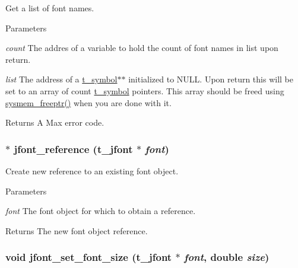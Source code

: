Get a list of font names. 
\begin{DoxyParams}{Parameters}
\item[{\em count}]The addres of a variable to hold the count of font names in list upon return. \item[{\em list}]The address of a \hyperlink{structt__symbol}{t\_\-symbol}$\ast$$\ast$ initialized to NULL. Upon return this will be set to an array of count \hyperlink{structt__symbol}{t\_\-symbol} pointers. This array should be freed using \hyperlink{group__memory_ga200c82639e547869db1f3887d17102d3}{sysmem\_\-freeptr()} when you are done with it. \end{DoxyParams}
\begin{DoxyReturn}{Returns}
A Max error code. 
\end{DoxyReturn}
\hypertarget{group__jfont_gaa3cdecfe931e80252a71bb6b2a9ee1f8}{
\subsubsection[{jfont\_\-reference}]{$\ast$ jfont\_\-reference ({\bf t\_\-jfont} $\ast$ {\em font})}}
\label{group__jfont_gaa3cdecfe931e80252a71bb6b2a9ee1f8}


Create new reference to an existing font object. 
\begin{DoxyParams}{Parameters}
\item[{\em font}]The font object for which to obtain a reference. \end{DoxyParams}
\begin{DoxyReturn}{Returns}
The new font object reference. 
\end{DoxyReturn}
\hypertarget{group__jfont_ga5857efa47dcf9dbc1822f7500c4aa5b3}{
\subsubsection[{jfont\_\-set\_\-font\_\-size}]{\setlength{\rightskip}{0pt plus 5cm}void jfont\_\-set\_\-font\_\-size ({\bf t\_\-jfont} $\ast$ {\em font}, \/  double {\em size})}}
\label{group__jfont_ga5857efa47dcf9dbc1822f7500c4aa5b3}


